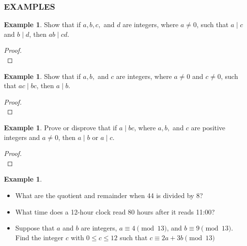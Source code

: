 \documentclass[letterpaper,10pt]{article}
\theoremstyle{plain}
\theoremstyle{definition}
\newtheorem{exmp}[thm]{Example}
\theoremstyle{remark}
\begin{document}
\subsubsection{EXAMPLES}
\begin{exmp}
Show that if \(a, b, c, \) and \(d\) are integers, where \(a \neq 0\), such that \(a \mid c\) and \(b \mid d\), then \(ab \mid cd\).
\begin{proof}$ $\\

\vspace{2cm}
\end{proof}
\end{exmp}

\begin{exmp}

Show that if \(a, b,\) and \(c\) are integers, where \(a \neq 0\) and \(c \neq 0\), such that \(ac \mid bc\), then \(a \mid b\).

\begin{proof}$ $\\

\vspace{2cm}
\end{proof}
\end{exmp}
\begin{exmp}

Prove or disprove that if \(a \mid bc\), where \(a, b,\) and \(c\) are positive integers and \(a \neq 0\), then \(a \mid b\) or \(a \mid c\).


\begin{proof}$ $\\

\vspace{2cm}
\end{proof}
\end{exmp}
\begin{exmp}
\begin{itemize} $ $\\
\item What are the quotient and remainder when 44 is divided by 8?
\item What time does a 12-hour clock read 80 hours after it reads 11:00?
\item Suppose that \(a\) and \(b\) are integers, \(a \equiv 4 \pmod{13}\), and \(b \equiv 9 \pmod{13}\). Find the integer \(c\) with \(0 \leq c \leq 12\) such that
\(c \equiv 2a + 3b \pmod{13}\)
\end{itemize}

\end{exmp}
\newpage
\end{document}
